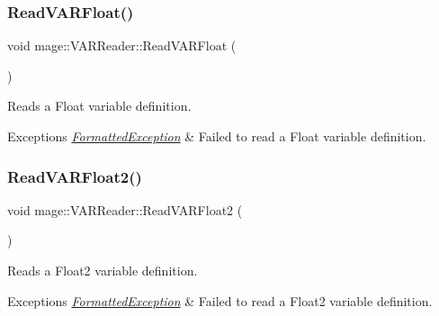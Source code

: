 \subsubsection{\texorpdfstring{Read\+V\+A\+R\+Float()}{ReadVARFloat()}}
{\footnotesize\ttfamily void mage\+::\+V\+A\+R\+Reader\+::\+Read\+V\+A\+R\+Float (\begin{DoxyParamCaption}{ }\end{DoxyParamCaption})\hspace{0.3cm}{\ttfamily [private]}}

Reads a Float variable definition.


\begin{DoxyExceptions}{Exceptions}
{\em \hyperlink{classmage_1_1_formatted_exception}{Formatted\+Exception}} & Failed to read a Float variable definition. \\
\hline
\end{DoxyExceptions}
\hypertarget{classmage_1_1_v_a_r_reader_a03a2cfead8f57843bb4a2c9bc8d00b67}{}\label{classmage_1_1_v_a_r_reader_a03a2cfead8f57843bb4a2c9bc8d00b67} 
\subsubsection{\texorpdfstring{Read\+V\+A\+R\+Float2()}{ReadVARFloat2()}}
{\footnotesize\ttfamily void mage\+::\+V\+A\+R\+Reader\+::\+Read\+V\+A\+R\+Float2 (\begin{DoxyParamCaption}{ }\end{DoxyParamCaption})\hspace{0.3cm}{\ttfamily [private]}}

Reads a Float2 variable definition.


\begin{DoxyExceptions}{Exceptions}
{\em \hyperlink{classmage_1_1_formatted_exception}{Formatted\+Exception}} & Failed to read a Float2 variable definition. \\
\hline
\end{DoxyExceptions}
\hypertarget{classmage_1_1_v_a_r_reader_a96e2af0f4462192867da2beead30ca67}{}\label{classmage_1_1_v_a_r_reader_a96e2af0f4462192867da2beead30ca67} 
